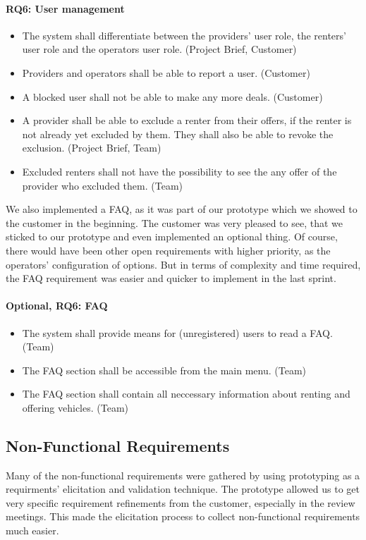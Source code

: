 \paragraph{RQ6: User management}
\begin{itemize}
    \item The system shall differentiate between the providers' user role, the renters' user role and the operators user role. (Project Brief, Customer)
    \item Providers and operators shall be able to report a user. (Customer)
    \item A blocked user shall not be able to make any more deals. (Customer)
    \item A provider shall be able to exclude a renter from their offers, if the renter is not already yet excluded by them. They shall also be able to revoke the exclusion. (Project Brief, Team)
    \item Excluded renters shall not have the possibility to see the any offer of the provider who excluded them. (Team)
\end{itemize}

We also implemented a FAQ, as it was part of our prototype which we showed to the customer in the beginning.
The customer was very pleased to see, that we sticked to our prototype and even implemented an optional thing.
Of course, there would have been other open requirements with higher priority, as the operators' configuration of options.
But in terms of complexity and time required, the FAQ requirement was easier and quicker to implement in the last sprint.

\paragraph{Optional, RQ6: FAQ}
\begin{itemize}
    \item  The system shall provide means for (unregistered) users to read a FAQ. (Team)
    \item The FAQ section shall be accessible from the main menu. (Team)
    \item The FAQ section shall contain all neccessary information about renting and offering vehicles. (Team)
\end{itemize}

\subsection{Non-Functional Requirements}
Many of the non-functional requirements were gathered by using prototyping as a requirments' elicitation and validation technique.
The prototype allowed us to get very specific requirement refinements from the customer, especially in the review meetings.
This made the elicitation process to collect non-functional requirements much easier.

